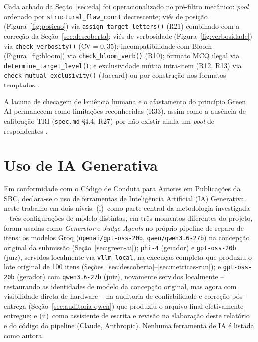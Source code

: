 \documentclass[12pt]{article}
\begin{document}
Cada achado da Seção~\ref{sec:eda} foi operacionalizado no pré-filtro
mecânico: \emph{pool} ordenado por \texttt{structural\_flaw\_count}
decrescente; viés de posição (Figura~\ref{fig:posicao}) via
\texttt{assign\_target\_letters()} (R21) combinado com a correção da
Seção~\ref{sec:descoberta}; viés de verbosidade (Figura~\ref{fig:verbosidade})
via \texttt{check\_verbosity()} (CV$=0{,}35$); incompatibilidade com
Bloom (Figura~\ref{fig:bloom}) via \texttt{check\_bloom\_verb()} (R10);
formato MCQ ilegal via \texttt{determine\_target\_level()}; e
exclusividade mútua intra-item (R12, R13) via
\texttt{check\_mutual\_exclusivity()} (Jaccard) ou por construção nos
formatos templados \cite{bailey2025exploring}.

A lacuna de checagem de leniência humana e o afastamento do princípio
Green AI permanecem como limitações reconhecidas (R33), assim como a
ausência de calibração TRI (\texttt{spec.md} \S4.4, R27) por não existir
ainda um \emph{pool} de respondentes \cite{liu2025leveraging}.

\section*{Uso de IA Generativa}
\label{sec:uso-ia}

Em conformidade com o Código de Conduta para Autores em Publicações da SBC,
declara-se o uso de ferramentas de Inteligência Artificial (IA) Generativa
neste trabalho em dois níveis: (i)~como parte central da metodologia
investigada -- três configurações de modelo distintas, em três momentos
diferentes do projeto, foram usadas como \emph{Generator} e \emph{Judge
  Agents} no próprio pipeline de reparo de itens: os modelos Groq
(\texttt{openai/gpt-oss-20b}, \texttt{qwen/qwen3.6-27b}) na concepção
original da submissão (Seção~\ref{sec:green-ai}); \texttt{phi-4} (gerador)
e \texttt{gpt-oss-20b} (juiz), servidos localmente via
\texttt{vllm\_local}, na execução completa que produziu o lote original
de 100 itens (Seções~\ref{sec:descoberta}--\ref{sec:metricas-run}); e
\texttt{gpt-oss-20b} (gerador) com \texttt{qwen3.6-27b} (juiz),
novamente servidos localmente -- restaurando as identidades de modelo da
concepção original, mas agora com visibilidade direta de hardware --
na auditoria de confiabilidade e correção pós-entrega
(Seção~\ref{sec:auditoria-qwen}) que produziu o arquivo final
efetivamente entregue; e (ii)~como assistente de
escrita e revisão na elaboração deste relatório e do código do pipeline
(Claude, Anthropic). Nenhuma ferramenta de IA é listada como autora.



\end{document}
